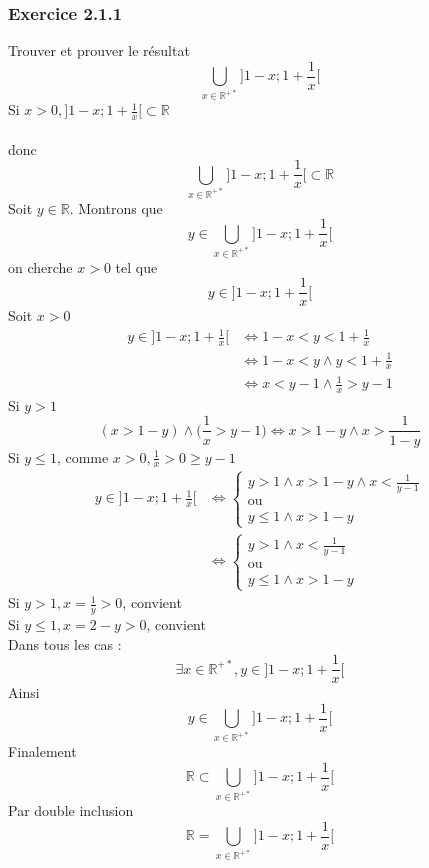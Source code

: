 \documentclass[a4paper,12pt]{article}
\begin{document}
\subsubsection{Exercice 2.1.1}
Trouver et prouver le résultat
\[
\bigcup_{x \in \mathbb{R}^{+*}} \Big] 1-x ; 1 + \frac{1}{x} \Big[
\]
Si $x > 0, \Big] 1 - x ; 1 + \frac{1}{x}\Big[ \subset \mathbb{R}$\\\\
donc 
\[
\bigcup_{x \in \mathbb{R}^{+*}} \Big] 1-x ; 1 + \frac{1}{x} \Big[ \subset \mathbb{R}
\]
Soit $y \in \mathbb{R}$. Montrons que 
\[
y \in \bigcup_{x \in \mathbb{R}^{+*}} \Big] 1-x ; 1 + \frac{1}{x} \Big[
\]
on cherche $x > 0$ tel que
\[
y \in \Big] 1 - x ; 1 + \frac{1}{x}\Big[ 
\]
Soit $x > 0$
\[
\begin{aligned}
y \in \Big] 1 - x ; 1 + \frac{1}{x}\Big[ &\Leftrightarrow 1-x < y  < 1+ \frac{1}{x}\\
& \Leftrightarrow 1 - x < y \wedge y < 1 + \frac{1}{x}\\
& \Leftrightarrow x < y - 1 \wedge \frac{1}{x} > y - 1
\end{aligned}
\]
Si $y > 1$
\[
(x > 1 - y) \wedge \Big(\frac{1}{x} > y - 1\Big) \Leftrightarrow x > 1-y \wedge x > \frac{1}{1-y}
\]
Si $y \le 1$, comme $x > 0, \frac{1}{x} > 0 \ge y - 1$
\[
\begin{aligned}
y \in \Big] 1 - x ; 1 + \frac{1}{x}\Big[& \Leftrightarrow 
\begin{cases}
y > 1 \wedge x > 1 - y \wedge x < \frac{1}{y-1}\\
\text{ou}\\
y \le 1 \wedge x > 1 - y
\end{cases}
\\
&\Leftrightarrow 
\begin{cases}
y > 1 \wedge x < \frac{1}{y-1}\\
\text{ou}\\
y \le 1 \wedge x > 1 - y
\end{cases}
\end{aligned}
\]
Si $ y > 1, x = \frac{1}{y} > 0$, convient\\
Si $ y \le 1, x = 2 - y > 0$, convient\\
Dans tous les cas :
\[
\exists x \in \mathbb{R}^{+*}, y \in \Big] 1 - x ; 1 + \frac{1}{x} \Big[
\]
Ainsi
\[
y \in \bigcup_{x \in \mathbb{R}^{+*}} \Big] 1-x ; 1 + \frac{1}{x} \Big[
\]
Finalement
\[
\mathbb{R} \subset \bigcup_{x \in \mathbb{R}^{+*}} \Big] 1-x ; 1 + \frac{1}{x} \Big[ 
\]
Par double inclusion 
\[
\mathbb{R} = \bigcup_{x \in \mathbb{R}^{+*}} \Big] 1-x ; 1 + \frac{1}{x} \Big[ 
\]
\end{document}
